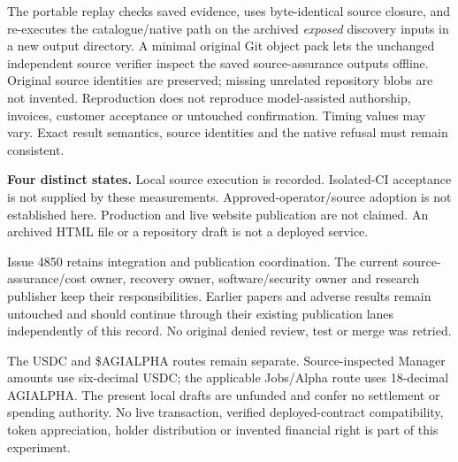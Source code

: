 \documentclass[11pt,letterpaper]{article}
\begin{document}
The portable replay checks saved evidence, uses byte-identical source closure, and re-executes the catalogue/native path on the archived \emph{exposed} discovery inputs in a new output directory. A minimal original Git object pack lets the unchanged independent source verifier inspect the saved source-assurance outputs offline. Original source identities are preserved; missing unrelated repository blobs are not invented. Reproduction does not reproduce model-assisted authorship, invoices, customer acceptance or untouched confirmation. Timing values may vary. Exact result semantics, source identities and the native refusal must remain consistent.

\begin{finding}
\textbf{Four distinct states.} Local source execution is recorded. Isolated-CI acceptance is not supplied by these measurements. Approved-operator/source adoption is not established here. Production and live website publication are not claimed. An archived HTML file or a repository draft is not a deployed service.
\end{finding}

Issue 4850 retains integration and publication coordination. The current source-assurance/cost owner, recovery owner, software/security owner and research publisher keep their responsibilities. Earlier papers and adverse results remain untouched and should continue through their existing publication lanes independently of this record. No original denied review, test or merge was retried.\cite{coordination}

The USDC and \$AGIALPHA routes remain separate. Source-inspected Manager amounts use six-decimal USDC; the applicable Jobs/Alpha route uses 18-decimal AGIALPHA. The present local drafts are unfunded and confer no settlement or spending authority. No live transaction, verified deployed-contract compatibility, token appreciation, holder distribution or invented financial right is part of this experiment.\cite{tokens}
\end{document}
